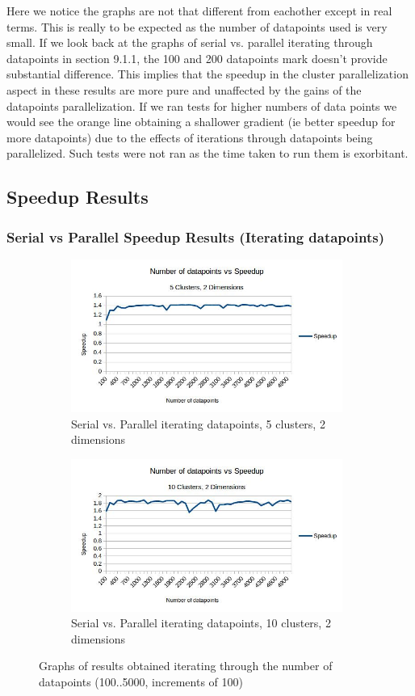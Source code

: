 \documentclass{article}
\begin{document}
Here we notice the graphs are not that different from eachother except in real terms. This is really to be expected as the number of datapoints used is very small. If we look back at the graphs of serial vs. parallel iterating through datapoints in section 9.1.1, the 100 and 200 datapoints mark doesn't provide substantial difference. This implies that the speedup in the cluster parallelization aspect in these results are more pure and unaffected by the gains of the datapoints parallelization. If we ran tests for higher numbers of data points we would see the orange line obtaining a shallower gradient (ie better speedup for more datapoints) due to the effects of iterations through datapoints being parallelized. Such tests were not ran as the time taken to run them is exorbitant.

\newpage
\subsection{Speedup Results}
\subsubsection{Serial vs Parallel Speedup Results (Iterating datapoints)}
\begin{figure}[h!]
    \begin{subfigure}{0.5\textwidth}
        \includegraphics[width=0.9\linewidth, height=5cm]{Pictures/datapoints1_Speedup.jpg}
        \caption{Serial vs. Parallel iterating datapoints, 5 clusters, 2 dimensions}
    \end{subfigure}
    \begin{subfigure}{0.5\textwidth}
        \includegraphics[width=0.9\linewidth, height=5cm]{Pictures/datapoints2_Speedup.jpg}
        \caption{Serial vs. Parallel iterating datapoints, 10 clusters, 2 dimensions}
    \end{subfigure}
\caption{Graphs of results obtained iterating through the number of datapoints (100..5000, increments of 100)}
\end{figure}
\end{document}
